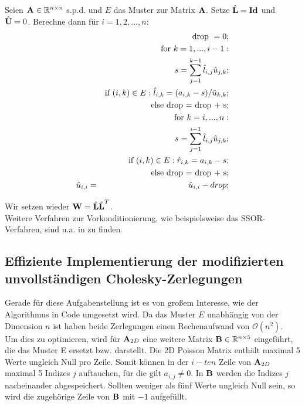 Seien ${\textbf{A}} \in \mathbb{R}^{n \times n}$ s.p.d. und $E$ das Muster zur Matrix ${\textbf{A}}$. Setze $\hat{{\textbf{L}}} = {\textbf{Id}}$ und $\hat{{\textbf{U}}} = 0$. Berechne dann für $i=1,2,...,n$:
\begin{eqnarray}
&&\textnormal{drop } = 0;\notag\\
&&\textnormal{for } k = 1,...,i-1:\notag\\
&&s = \sum_{j=1}^{k-1} \hat l_{i,j} \hat u_{j,k};\notag\\
&&\textnormal{if } (i,k) \in E: \hat l_{i,k} = (a_{i,k} - s)/ \hat u_{k,k};\notag\\
&&\textnormal{else drop = drop + s};\notag \\
&&\textnormal{for } k = i,...,n: \notag \\
&&s = \sum_{j=1}^{i-1} \hat l_{i,j} \hat u_{j,k};\notag\\
&&\textnormal{if } (i,k) \in E: \hat r_{i,k} = a_{i,k} - s; \notag\\
&&\textnormal{else drop = drop + s};\notag \\
\hat u_{i,i} &=& \hat u_{i,i} -drop;
\end{eqnarray}

Wir setzen wieder ${\textbf{W}} = \hat{{\textbf{L}}} \hat{{\textbf{L}}}^{T}$. \\

Weitere Verfahren zur Vorkonditionierung, wie beispielsweise das SSOR-Verfahren, sind u.a. in \cite[S. 105-106]{SAAD03} zu finden.

\subsection{Effiziente Implementierung der modifizierten unvollständigen Cholesky-Zerlegungen}

Gerade für diese Aufgabenstellung ist es von großem Interesse, wie der Algorithmus in Code umgesetzt wird. Da das Muster $E$ unabhängig von der Dimension $n$ ist haben beide Zerlegungen einen Rechenaufwand von $\mathcal{O}(n^{2})$.\\
Um dies zu optimieren, wird für ${\textbf{A}}_{2D}$ eine weitere Matrix ${\textbf{B}} \in \mathbb{R}^{n \times 5}$ eingeführt, die das Muster E ersetzt bzw. darstellt. Die 2D Poisson Matrix enthält maximal 5 Werte ungleich Null pro Zeile. Somit können in der $i - ten$ Zeile von ${\textbf{A}}_{2D}$ maximal 5 Indizes $j$ auftauchen, für die gilt $a_{i,j} \ne 0$. In ${\textbf{B}}$ werden die Indizes $j$ nacheinander abgespeichert. Sollten weniger als fünf Werte ungleich Null sein, so wird die zugehörige Zeile von ${\textbf{B}}$ mit $-1$ aufgefüllt.

